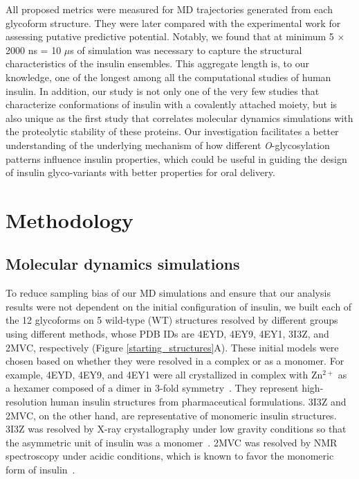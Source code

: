 \documentclass[sn-vancouver]{sn-jnl}
\begin{document}
All proposed metrics were measured for MD trajectories generated from each glycoform structure. They were later compared with the experimental work for assessing putative predictive potential. Notably, we found that at minimum 5 $\times$ 2000 ns = 10 $\mu$s of simulation was necessary to capture the structural characteristics of the insulin ensembles. This aggregate length is, to our knowledge, one of the longest among all the computational studies of human insulin. In addition, our study is not only one of the very few studies that characterize conformations of insulin with a covalently attached moiety, but is also unique as the first study that correlates molecular dynamics simulations with the proteolytic stability of these proteins. Our investigation facilitates a better understanding of the underlying mechanism of how different \emph{O}-glycosylation patterns influence insulin properties, which could be useful in guiding the design of insulin glyco-variants with better properties for oral delivery.

\section{Methodology}
\subsection{Molecular dynamics simulations}
To reduce sampling bias of our MD simulations and ensure that our analysis results were not dependent on the initial configuration of insulin, we built each of the 12 glycoforms on 5 wild-type (WT) structures resolved by different groups using different methods, whose PDB IDs are 4EYD, 4EY9, 4EY1, 3I3Z, and 2MVC, respectively (Figure \ref{starting_structures}A). These initial models were chosen based on whether they were resolved in a complex or as a monomer. For example, 4EYD, 4EY9, and 4EY1 were all crystallized in complex with Zn$^{2+}$ as a hexamer composed of a dimer in 3-fold symmetry~\cite{favero2013structural}. They represent high-resolution human insulin structures from pharmaceutical formulations. 3I3Z and 2MVC, on the other hand, are representative of monomeric insulin structures. 3I3Z was resolved by X-ray crystallography under low gravity conditions so that the asymmetric unit of insulin was a monomer~\cite{timofeev2010x}. 2MVC was resolved by NMR spectroscopy under acidic conditions, which is known to favor the monomeric form of insulin~\cite{kvrivzkova2014structural}.
\end{document}
